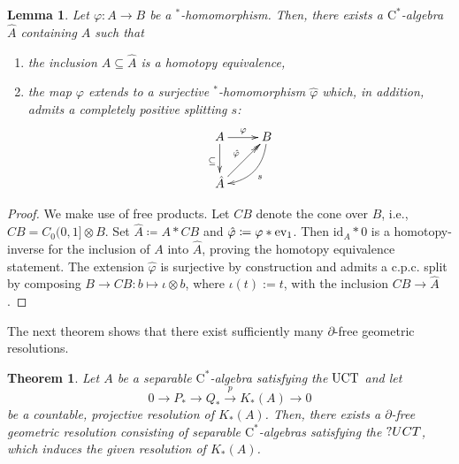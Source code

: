 \documentclass[a4paper,10pt]{amsart}
\newcommand{\T}[1]{\textup{#1}}
\newcommand{\cstar}{\ensuremath{\mathrm C^\ast}}
\newcommand{\Star}{{}^\ast}
\newcounter{theorem}
\newtheorem{thm}[theorem]{Theorem}
\newtheorem{lemma}[theorem]{Lemma}
\numberwithin{equation}{section}
\numberwithin{theorem}{section}
\newcommand{\id}{\mathrm{id}}
\begin{document}
\begin{lemma}
\label{lem:trick}
Let $\varphi\colon A\to B$ be a $\Star$-homomorphism. Then, there exists a $\cstar$-algebra $\hat{A}$ containing $A$ such that
\begin{enumerate}
	\item the inclusion $A\subseteq \hat{A}$ is a homotopy equivalence, 
	\item the map $\varphi$ extends to a surjective $\Star$-homomorphism $\hat{\varphi}$ which, in addition, admits a completely positive splitting $s$:
		\[
		\begin{xy}
		\xymatrix{
			A \ar[r]^\varphi \ar[d]_\subseteq & B \ar@/^1pc/[dl]^s \\
			\hat{A} \ar@{->>}[ur]^{\hat{\varphi}}
		}
		\end{xy}
		\]
\end{enumerate}
\end{lemma}

\begin{proof}
We make use of free products. Let $CB$ denote the cone over $B$, i.e., $CB = C_0(0,1] \otimes B$. Set $\hat{A}\coloneqq A\ast CB$ and $\hat{\varphi}\coloneqq \varphi\ast \T{ev}_1$. Then $\id_A\ast 0$ is a homotopy-inverse for the inclusion of $A$ into $\hat{A}$, proving the homotopy equivalence statement.
The extension $\hat{\varphi}$ is surjective by construction and admits a c.p.c. split by composing $B \to CB:   b \mapsto \iota \otimes  b$, where $\iota(t) := t$, with the inclusion $CB \to \hat{A}$.
\end{proof}

The next theorem shows that there exist sufficiently many $\partial$-free geometric resolutions.

\begin{thm}
\label{thm:existence-resolutions}
Let $A$ be a separable $\cstar$-algebra satisfying the $\T{UCT}$ and let  
\[
	0\to P_* \to Q_* \stackrel{p}\longrightarrow K_*(A) \to 0
\]
 be a countable, projective resolution of $K_*(A)$.
Then, there exists a $\partial$-free geometric resolution consisting of separable $\cstar$-algebras satisfying the $\T?{UCT}$, which induces the given resolution of $K_*(A)$. 
\end{thm}
\end{document}
